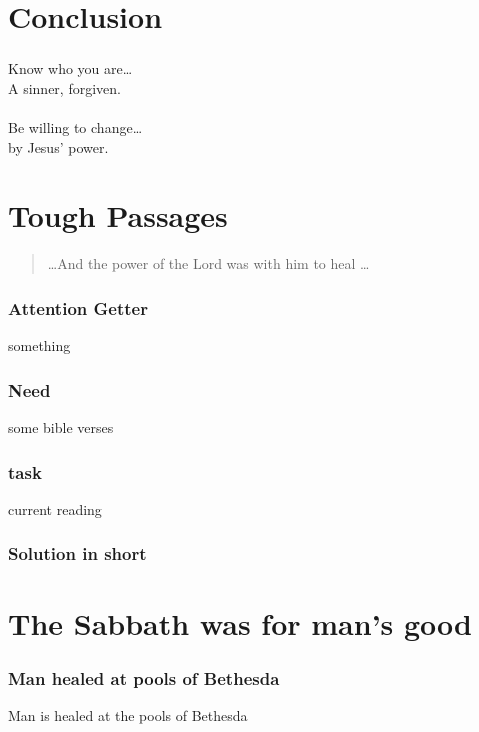 \documentclass{beamer}
\begin{document}
\section*{Conclusion}
\begin{frame}
\frametitle{}
Know who you are\ldots\\
A sinner, forgiven.\\~\\
Be willing to change\ldots\\
by Jesus' power.

\end{frame}

\section*{Tough Passages}

\begin{frame}
\begin{quote}
\dots And the power of the Lord was with him to heal \dots

\end{quote}

\end{frame}


\begin{frame}
\frametitle{Attention Getter}
something
\end{frame}

\begin{frame}
\frametitle{Need}
some bible verses
\end{frame}

\begin{frame}
\frametitle{task}
current reading
\end{frame}

\begin{frame}
\frametitle{Solution in short}
\end{frame}

\begin{frame}
\frametitle{\insertlecture}
\tableofcontents[sectionstyle=show/show]
\end{frame}

\section{The Sabbath was for man's good}
\begin{frame}
\frametitle{Man healed at pools of Bethesda}
Man is healed at the pools of Bethesda 
\end{frame}
\end{document}
